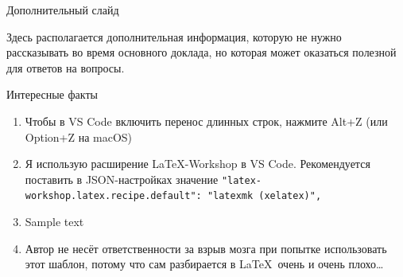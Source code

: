 \documentclass[10pt,aspectratio=169]{beamer}
\begin{document}
\begin{frame}[noframenumbering]{Дополнительный слайд}
    \thispagestyle{empty}
    
    Здесь располагается дополнительная информация, которую не нужно рассказывать во время основного доклада, но которая может оказаться полезной для ответов на вопросы.
\end{frame}

\begin{frame}[noframenumbering]{Интересные факты}
    \thispagestyle{empty}
    
    \begin{enumerate}
        \item Чтобы в VS Code включить перенос длинных строк, нажмите Alt+Z (или Option+Z на macOS)
        \item Я использую расширение \LaTeX-Workshop в VS Code. Рекомендуется поставить в JSON-настройках значение \newline
        \texttt{"latex-workshop.latex.recipe.default": "latexmk (xelatex)",}
        \item Sample text
        \item Автор не несёт ответственности за взрыв мозга при попытке использовать этот шаблон, потому что сам разбирается в \LaTeX\ очень и очень плохо…
    \end{enumerate}
\end{frame}
\end{document}
